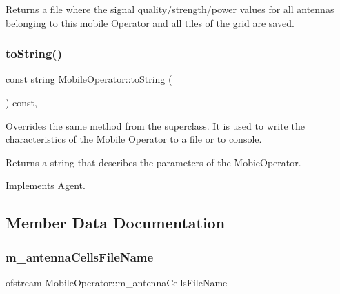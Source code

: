 \begin{DoxyReturn}{Returns}
a file where the signal quality/strength/power values for all antennas belonging to this mobile Operator and all tiles of the grid are saved. 
\end{DoxyReturn}
\mbox{\label{class_mobile_operator_aa83724a149499ef10678ad651a5b40df}} 
\subsubsection{\texorpdfstring{toString()}{toString()}}
{\footnotesize\ttfamily const string Mobile\+Operator\+::to\+String (\begin{DoxyParamCaption}{ }\end{DoxyParamCaption}) const\hspace{0.3cm}{\ttfamily [override]}, {\ttfamily [virtual]}}

Overrides the same method from the superclass. It is used to write the characteristics of the Mobile Operator to a file or to console. \begin{DoxyReturn}{Returns}
a string that describes the parameters of the Mobie\+Operator. 
\end{DoxyReturn}


Implements \mbox{\hyperlink{class_agent_a44f291596d10c7878b0641d6ec156328}{Agent}}.



\subsection{Member Data Documentation}
\mbox{\label{class_mobile_operator_abd11e27d3ed1273be761a55da1549fa4}} 
\subsubsection{\texorpdfstring{m\_antennaCellsFileName}{m\_antennaCellsFileName}}
{\footnotesize\ttfamily ofstream Mobile\+Operator\+::m\+\_\+antenna\+Cells\+File\+Name\hspace{0.3cm}{\ttfamily [private]}}

\mbox{\label{class_mobile_operator_adc9bb6e834adbaf7f85ad7cf9e4c9bec}} 
